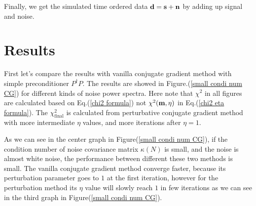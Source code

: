 \documentclass[twocolumn,linenumbers]{aastex631}
\newcommand{\vbd}{\vb{d}}
\newcommand{\vbm}{\vb{m}}
\newcommand{\Pdagger}{P^{\dagger}}
\begin{document}
Finally, we get the simulated time ordered data $\vb{d} = \vb{s} + \vb{n}$ by
adding up signal and noise.

\section{Results}
First let's compare the results with vanilla conjugate gradient method with
simple preconditioner $\Pdagger P$.
The results are showed in Figure.(\ref{small condi num CG}) for different kinds
of noise power spectra.
Here note that $\chi^2$ in all figures are calculated based on
Eq.(\ref{chi2 formula})
not $\chi^2(\vbm, \eta)$ in Eq.(\ref{chi2 eta formula}).
The $\chi^2_{\text{final}}$ is calculated from perturbative conjugate gradient
method with more intermediate $\eta$ values, and more iterations after
$\eta=1$.

As we can see in the center graph in Figure(\ref{small condi num CG}),
if the condition number of noise covariance matrix $\kappa(N)$ is small,
and the noise is almost white noise,
the performance between different these two methods is small.
The vanilla conjugate gradient method converge faster, because its perturbation
parameter goes to $1$ at the first iteration, however for the perturbation method its
$\eta$ value will slowly reach $1$ in few iterations as we can see in
the third graph in Figure(\ref{small condi num CG}).
\end{document}
